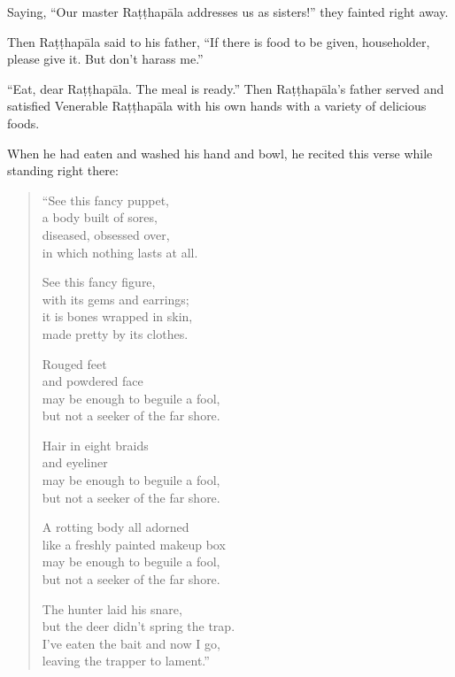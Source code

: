 \documentclass[12pt,openany]{book}%
\begin{document}
Saying, “Our master \textsanskrit{Raṭṭhapāla} addresses us as sisters!” they fainted right away. 

Then \textsanskrit{Raṭṭhapāla} said to his father, “If there is food to be given, householder, please give it. But don’t harass me.” 

“Eat, dear \textsanskrit{Raṭṭhapāla}. The meal is ready.” Then \textsanskrit{Raṭṭhapāla}’s father served and satisfied Venerable \textsanskrit{Raṭṭhapāla} with his own hands with a variety of delicious foods. 

When he had eaten and washed his hand and bowl, he recited this verse while standing right there: 

\begin{verse}%
“See this fancy puppet, \\
a body built of sores, \\
diseased, obsessed over, \\
in which nothing lasts at all. 

See this fancy figure, \\
with its gems and earrings; \\
it is bones wrapped in skin, \\
made pretty by its clothes. 

Rouged feet \\
and powdered face \\
may be enough to beguile a fool, \\
but not a seeker of the far shore. 

Hair in eight braids \\
and eyeliner \\
may be enough to beguile a fool, \\
but not a seeker of the far shore. 

A rotting body all adorned \\
like a freshly painted makeup box \\
may be enough to beguile a fool, \\
but not a seeker of the far shore. 

The hunter laid his snare, \\
but the deer didn’t spring the trap. \\
I’ve eaten the bait and now I go, \\
leaving the trapper to lament.” 

%
\end{verse}
\end{document}
